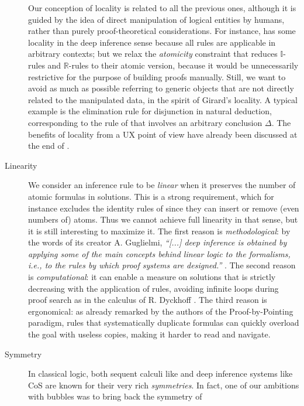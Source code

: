 \begin{description}
    Our conception of locality is related to all the previous ones, although it
    is guided by the idea of direct manipulation of logical entities by humans,
    rather than purely proof-theoretical considerations. For instance, 
    has some locality in the deep inference sense because all rules are
    applicable in arbitrary contexts; but we relax the \emph{atomicity}
    constraint that reduces $\mathbb{I}$-rules and $\mathbb{R}$-rules to their
    atomic version, because it would be unnecessarily restrictive for the
    purpose of building proofs manually. Still, we want to avoid as much as
    possible referring to generic objects that are not directly related to the
    manipulated data, in the spirit of Girard's locality. A typical example is
    the elimination rule for disjunction in natural deduction, corresponding to
    the {\rnmsf{{\lor}{-}}} rule of  that involves an arbitrary
    conclusion $\Delta$. The benefits of locality from a UX point of view have
    already been discussed at the end of .
  \item[Linearity] 
    We consider an inference rule to be \emph{linear} when it preserves the
    number of atomic formulas in solutions. This is a strong requirement, which
    for instance excludes the identity rules of  since they can insert
    or remove (even numbers of) atoms. Thus we cannot achieve full linearity in
    that sense, but it is still interesting to maximize it. The first reason is
    \emph{methodological}: by the words of its creator A. Guglielmi,
    \textit{``[...] deep inference is obtained by applying some of the main
    concepts behind linear logic to the formalisms, i.e., to the rules by which
    proof systems are designed.''} . The second reason is
    \emph{computational}: it can enable a measure on solutions that is strictly
    decreasing with the application of rules, avoiding infinite loops during
    proof search as in the calculus  of R. Dyckhoff
    \cite{dyckhoff_contraction-free_1992}. The third reason is ergonomical: as
    already remarked by the authors of the Proof-by-Pointing
    paradigm, rules that systematically
    duplicate formulas can quickly overload the goal with useless copies, making
    it harder to read and navigate.
  \item[Symmetry] 
    In classical logic, both sequent calculi like  and deep inference
    systems like CoS are known for their very rich \emph{symmetries}. In fact,
    one of our ambitions with bubbles was to bring back the symmetry of

\end{description}

